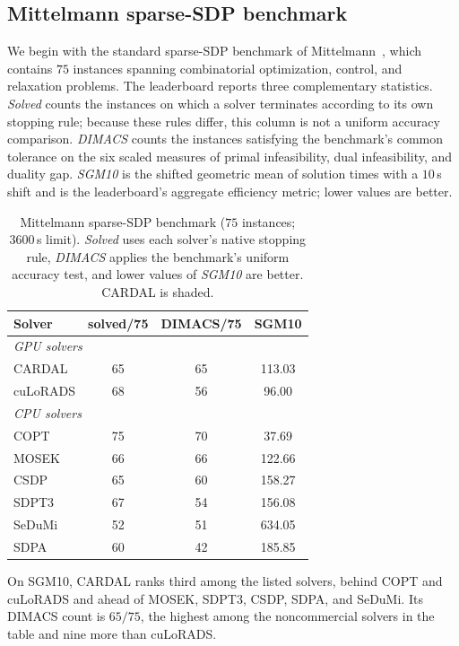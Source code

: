 \documentclass[11pt]{article}
\theoremstyle{definition}
\theoremstyle{remark}
\newcommand{\name}{\textsc{CARDAL}\xspace}
\begin{document}
\subsection{Mittelmann sparse-SDP benchmark}
\label{subsec:mittelmann}

We begin with the standard sparse-SDP benchmark of
Mittelmann~\cite{Mittelmann}, which contains $75$ instances spanning
combinatorial optimization, control, and relaxation problems.  The
leaderboard reports three complementary statistics.  \emph{Solved} counts
the instances on which a solver terminates according to its own stopping
rule; because these rules differ, this column is not a uniform accuracy
comparison.  \emph{DIMACS} counts the instances satisfying the benchmark's
common tolerance on the six scaled measures of primal infeasibility, dual
infeasibility, and duality gap.  \emph{SGM10} is the shifted geometric mean
of solution times with a $10$\,s shift and is the leaderboard's aggregate
efficiency metric; lower values are better.

\begin{table}[H]
\centering
\caption{Mittelmann sparse-SDP benchmark ($75$ instances; $3600$\,s limit).
\emph{Solved} uses each solver's native stopping rule, \emph{DIMACS} applies
the benchmark's uniform accuracy test, and lower values of \emph{SGM10} are
better.
\name{} is shaded.}
\label{tab:mittelmann}
\begin{tabular}{lccc}
\toprule
\textbf{Solver} & \textbf{solved/75} & \textbf{DIMACS/75}
& \textbf{SGM10}\\
\midrule
\multicolumn{4}{l}{\textit{GPU solvers}}\\
\rowcolor{gray!15}
\name{}  & 65 & 65 & 113.03\\
cuLoRADS & 68 & 56 & 96.00\\
\midrule
\multicolumn{4}{l}{\textit{CPU solvers}}\\
COPT     & 75 & 70 & 37.69\\
MOSEK    & 66 & 66 & 122.66\\
CSDP     & 65 & 60 & 158.27\\
SDPT3    & 67 & 54 & 156.08\\
SeDuMi   & 52 & 51 & 634.05\\
SDPA     & 60 & 42 & 185.85\\
\bottomrule
\end{tabular}
\end{table}

On SGM10, \name{} ranks third among the listed solvers, behind COPT and
cuLoRADS and ahead of MOSEK, SDPT3, CSDP, SDPA, and SeDuMi.  Its DIMACS
count is $65/75$, the highest among the noncommercial solvers in the table
and nine more than cuLoRADS.
\end{document}
